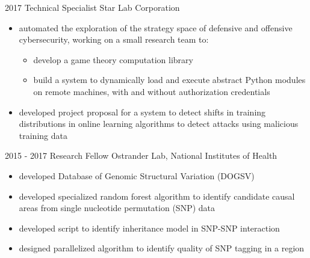 \documentclass[]{resume}
\begin{document}
\begin{multicols}{2}
\begin{entrylist}
  \entry
    {2017}
    {Technical Specialist}
    {Star Lab Corporation}
    {\begin{itemize}[leftmargin=*]
	      \item automated the exploration of the strategy space of defensive and offensive cybersecurity, working on a small research team to: 
	    	\begin{itemize}
	    	    \item develop a game theory computation library 
	      		\item build a system to dynamically load and execute abstract Python modules on remote machines, with and without authorization credentials 
	    	\end{itemize}
	       \item developed project proposal for a system to detect shifts in training distributions in online learning algorithms to detect attacks using malicious training data
     \end{itemize}}
  \entry
    {2015 - 2017}
    {Research Fellow}
    {Ostrander Lab, National Institutes of Health}
    {\begin{itemize}[leftmargin=*]
     	  \item developed Database of Genomic Structural Variation (DOGSV) 
	      \item developed specialized random forest algorithm to identify candidate causal areas from single nucleotide permutation (SNP) data
	      \item developed script to identify inheritance model in SNP-SNP interaction
          \item designed parallelized algorithm to identify quality of SNP tagging in a region  
     \end{itemize}}
\end{entrylist}

\end{multicols}
\end{document}
